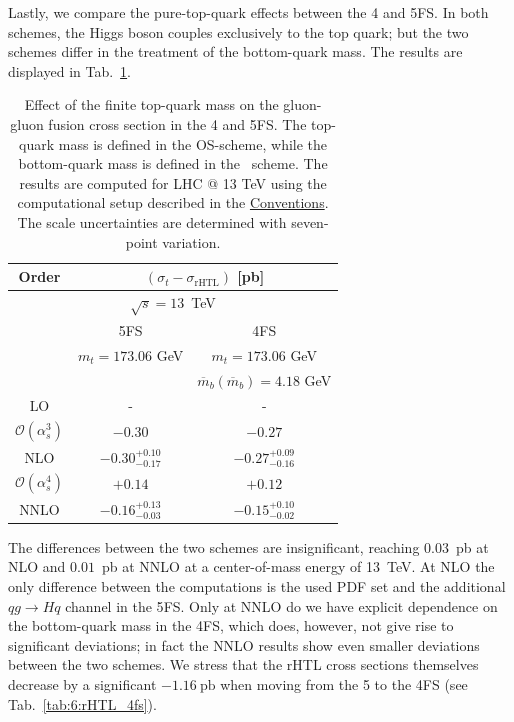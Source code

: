 Lastly, we compare the pure-top-quark effects between the 4 and 5\acs{FS}. In both schemes, the Higgs boson couples exclusively to the top quark; but the two schemes differ in the treatment of the bottom-quark mass. The results are displayed in Tab.~\ref{tab:6:t-rHTL_4vs5FS}.
\begin{table}[ht]
\centering
\begin{tabular}{ccc}
  \hline
  Order & \multicolumn{2}{c}{$(\sigma_{t} - \sigma_\text{rHTL})$ [pb]} \\
  \hline
  \hline
  \multicolumn{3}{c}{$\sqrt{s}=13$~TeV} \\
  \hline
  & 5FS & 4FS \\
  & $m_t = 173.06$ GeV &  $m_t = 173.06$ GeV \\
  & & $\overline{m}_b(\overline{m}_b)=4.18$ GeV\\
  \hline
  LO & - & - \\
  \hline
  $\mathcal{O}(\alpha_s^3)$ & $-0.30$  &  $-0.27$ \\
  NLO & $-0.30^{+0.10}_{-0.17}$ & $-0.27^{+0.09}_{-0.16}$ \\
  \hline
  $\mathcal{O}(\alpha_s^4)$ & $+0.14$ & $+0.12$ \\
  NNLO & $-0.16^{+0.13}_{-0.03}$ & $-0.15^{+0.10}_{-0.02}$\\
  \hline
  \end{tabular}
\caption{Effect of the finite top-quark mass on the gluon-gluon fusion cross section in the 4 and 5\acs{FS}. The top-quark mass is defined in the \acs{OS}-scheme, while the bottom-quark mass is defined in the \MS\ scheme. The results are computed for LHC @ 13 TeV using the computational setup described in the \hyperref[chap:notation_and_conventions]{Conventions}. The scale uncertainties are determined with seven-point variation.}
\label{tab:6:t-rHTL_4vs5FS}
\end{table}
The differences between the two schemes are insignificant, reaching $0.03$~pb at \acs{NLO} and $0.01$~pb at \acs{NNLO} at a center-of-mass energy of 13~TeV. At \acs{NLO} the only difference between the computations is the used \acs{PDF} set and the additional $qg \longrightarrow Hq$ channel in the 5\acs{FS}. Only at \acs{NNLO} do we have explicit dependence on the bottom-quark mass in the 4\acs{FS}, which does, however, not give rise to significant deviations; in fact the \acs{NNLO} results show even smaller deviations between the two schemes. We stress that the \acs{rHTL} cross sections themselves decrease by a significant $-1.16\ \mathrm{pb}$ when moving from the 5 to the 4\acs{FS} (see Tab.~\ref{tab:6:rHTL_4fs}).

